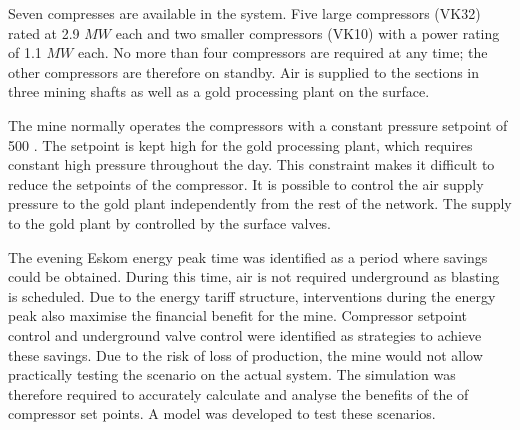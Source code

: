 \par 
 Seven compresses are available in the system. Five large compressors (VK32) rated at 2.9 $MW$ each and two smaller compressors (VK10) with a power rating of 1.1 $MW$ each. No more than four compressors are required at any time; the other compressors are therefore on standby. Air is supplied to the sections in three mining shafts as well as a gold processing plant on the surface. 
 \par 
 The mine normally operates the compressors with a constant pressure setpoint of 500 . The setpoint is kept high for the gold processing plant, which requires constant high pressure throughout the day. This constraint makes it difficult to reduce the setpoints of the compressor. It is possible to control the air supply pressure to the gold plant independently from the rest of the network. The supply to the gold plant by controlled by the surface valves.
 \par 
 The evening Eskom energy peak time was identified as a period where savings could be obtained. During this time, air is not required underground as blasting is scheduled. Due to the energy tariff structure, interventions during the energy peak also maximise the financial benefit for the mine. Compressor setpoint control and underground valve control were identified as strategies to achieve these savings. Due to the risk of loss of production, the mine would not allow practically testing the scenario on the actual system. The simulation was therefore required to accurately calculate and analyse the benefits of the of compressor set points. A model was developed to test these scenarios.

